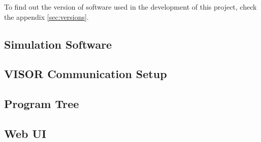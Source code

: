 To find out the version of software used in the development of this project, check the appendix \ref{sec:versions}.


\subsection{Simulation Software}
\label{subsec:simulation-software}



\subsection{VISOR Communication Setup}
\label{subsec:computer-vision}


\subsection{Program Tree}
\label{subsec:program-tree}


\subsection{Web UI}
\label{subsec:web-ui}
